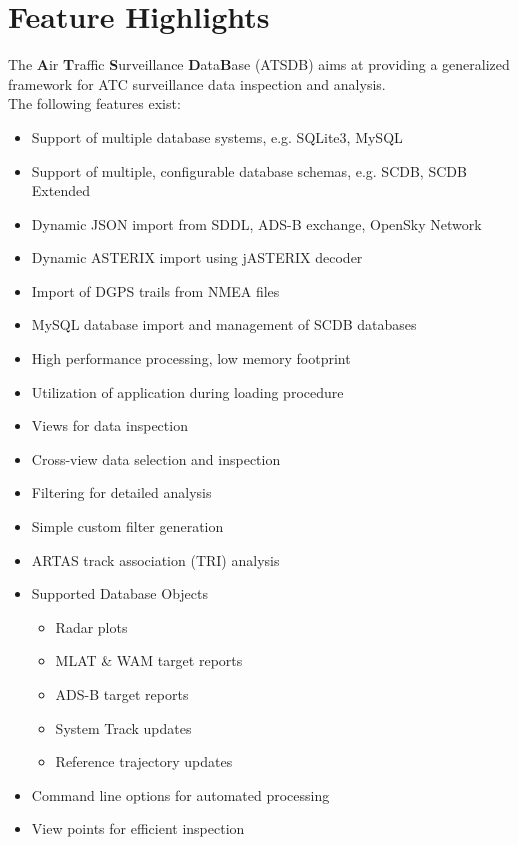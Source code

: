 \section{Feature Highlights}

The \textbf{A}ir \textbf{T}raffic \textbf{S}urveillance \textbf{D}ata\textbf{B}ase (ATSDB) aims at providing a generalized framework for ATC surveillance data inspection and analysis. \\

The following features exist: \\

\begin{itemize}  
\item Support of multiple database systems, e.g. SQLite3, MySQL
\item Support of multiple, configurable database schemas, e.g. SCDB, SCDB Extended
\item Dynamic JSON import from SDDL, ADS-B exchange, OpenSky Network
\item Dynamic ASTERIX import using jASTERIX decoder
\item Import of DGPS trails from NMEA files
\item MySQL database import and management of SCDB databases
\item High performance processing, low memory footprint
\item Utilization of application during loading procedure
\item Views for data inspection
\item Cross-view data selection and inspection
\item Filtering for detailed analysis
\item Simple custom filter generation
\item ARTAS track association (TRI) analysis
\item Supported Database Objects
\begin{itemize}  
\item Radar plots
\item MLAT \& WAM target reports
\item ADS-B target reports
\item System Track updates
\item Reference trajectory updates
\end{itemize}
\item Command line options for automated processing
\item View points for efficient inspection
\end{itemize} 
